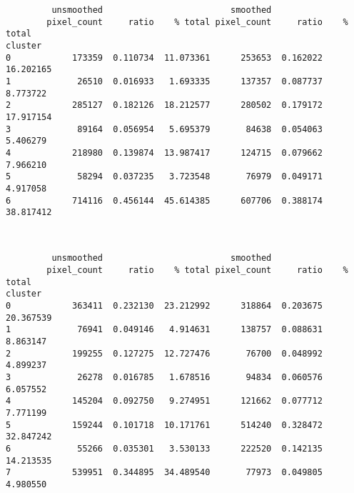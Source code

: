 \documentclass[11pt]{article}
\begin{document}
    
    \begin{verbatim}
         unsmoothed                         smoothed                     
        pixel_count     ratio    % total pixel_count     ratio    % total
cluster                                                                  
0            173359  0.110734  11.073361      253653  0.162022  16.202165
1             26510  0.016933   1.693335      137357  0.087737   8.773722
2            285127  0.182126  18.212577      280502  0.179172  17.917154
3             89164  0.056954   5.695379       84638  0.054063   5.406279
4            218980  0.139874  13.987417      124715  0.079662   7.966210
5             58294  0.037235   3.723548       76979  0.049171   4.917058
6            714116  0.456144  45.614385      607706  0.388174  38.817412
    \end{verbatim}

    
    \begin{center}
    \end{center}
    { \hspace*{\fill} \\}
    
    
    \begin{verbatim}
         unsmoothed                         smoothed                     
        pixel_count     ratio    % total pixel_count     ratio    % total
cluster                                                                  
0            363411  0.232130  23.212992      318864  0.203675  20.367539
1             76941  0.049146   4.914631      138757  0.088631   8.863147
2            199255  0.127275  12.727476       76700  0.048992   4.899237
3             26278  0.016785   1.678516       94834  0.060576   6.057552
4            145204  0.092750   9.274951      121662  0.077712   7.771199
5            159244  0.101718  10.171761      514240  0.328472  32.847242
6             55266  0.035301   3.530133      222520  0.142135  14.213535
7            539951  0.344895  34.489540       77973  0.049805   4.980550
    \end{verbatim}

    
    \begin{center}
    \end{center}
    { \hspace*{\fill} \\}
    
\end{document}
